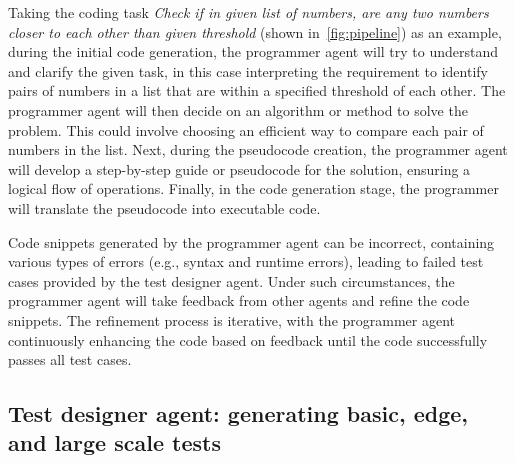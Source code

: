 \documentclass{article}
\begin{document}
Taking the coding task \textit{Check if in given list of numbers, are any two numbers closer to each other than given threshold} (shown in~\cref{fig:pipeline}) as an example, during the initial code generation, the programmer agent will try to understand and clarify the given task, in this case interpreting the requirement to identify pairs of numbers in a list that are within a specified threshold of each other. The programmer agent will then decide on an algorithm or method to solve the problem. This could involve choosing an efficient way to compare each pair of numbers in the list. Next, during the pseudocode creation, the programmer agent will develop a step-by-step guide or pseudocode for the solution, ensuring a logical flow of operations. Finally, in the code generation stage, the programmer will translate the pseudocode into executable code.

Code snippets generated by the programmer agent can be incorrect, containing various types of errors (e.g., syntax and runtime errors), leading to failed test cases provided by the test designer agent.
Under such circumstances, the programmer agent will take feedback from other agents and refine the code snippets. The refinement process is iterative, with the programmer agent continuously enhancing the code based on feedback until the code successfully passes all test cases.


\subsection{Test designer agent: generating basic, edge, and large scale tests}
\end{document}
